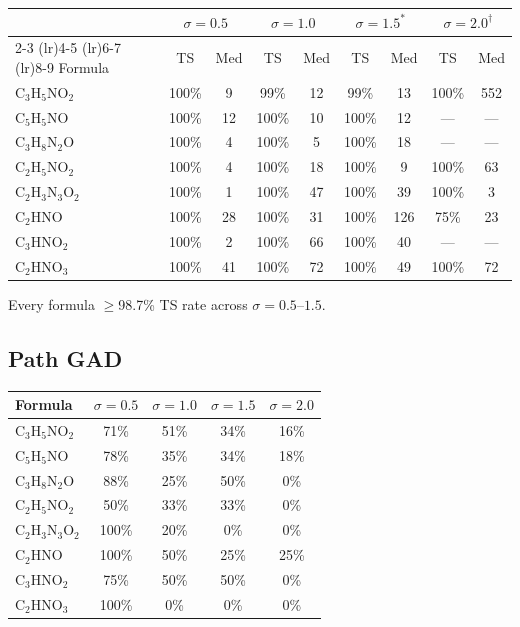 \documentclass[11pt,a4paper]{article}
\begin{document}
\begin{center}\small
\begin{tabular}{lcccccccc}
\toprule
 & \multicolumn{2}{c}{$\sigma = 0.5$} & \multicolumn{2}{c}{$\sigma = 1.0$}
 & \multicolumn{2}{c}{$\sigma = 1.5^*$} & \multicolumn{2}{c}{$\sigma = 2.0^\dagger$} \\
\cmidrule(lr){2-3} \cmidrule(lr){4-5} \cmidrule(lr){6-7} \cmidrule(lr){8-9}
Formula & TS & Med & TS & Med & TS & Med & TS & Med \\
\midrule
C$_3$H$_5$NO$_2$ & 100\% & 9  & 99\% & 12 & 99\% & 13 & 100\% & 552 \\
C$_5$H$_5$NO      & 100\% & 12 & 100\% & 10 & 100\% & 12 & --- & --- \\
C$_3$H$_8$N$_2$O  & 100\% & 4  & 100\% & 5  & 100\% & 18 & --- & --- \\
C$_2$H$_5$NO$_2$  & 100\% & 4  & 100\% & 18 & 100\% & 9  & 100\% & 63 \\
C$_2$H$_3$N$_3$O$_2$ & 100\% & 1 & 100\% & 47 & 100\% & 39 & 100\% & 3 \\
C$_2$HNO           & 100\% & 28 & 100\% & 31 & 100\% & 126 & 75\% & 23 \\
C$_3$HNO$_2$       & 100\% & 2  & 100\% & 66 & 100\% & 40 & --- & --- \\
C$_2$HNO$_3$       & 100\% & 41 & 100\% & 72 & 100\% & 49 & 100\% & 72 \\
\bottomrule
\end{tabular}
\end{center}

Every formula $\geq$98.7\% TS rate across $\sigma = 0.5$--$1.5$.

\subsection{Path GAD}

\begin{center}\small
\begin{tabular}{lcccc}
\toprule
Formula & $\sigma = 0.5$ & $\sigma = 1.0$ & $\sigma = 1.5$ & $\sigma = 2.0$ \\
\midrule
C$_3$H$_5$NO$_2$ & 71\% & 51\% & 34\% & 16\% \\
C$_5$H$_5$NO      & 78\% & 35\% & 34\% & 18\% \\
C$_3$H$_8$N$_2$O  & 88\% & 25\% & 50\% & 0\% \\
C$_2$H$_5$NO$_2$  & 50\% & 33\% & 33\% & 0\% \\
C$_2$H$_3$N$_3$O$_2$ & 100\% & 20\% & 0\% & 0\% \\
C$_2$HNO           & 100\% & 50\% & 25\% & 25\% \\
C$_3$HNO$_2$       & 75\% & 50\% & 50\% & 0\% \\
C$_2$HNO$_3$       & 100\% & 0\% & 0\% & 0\% \\
\bottomrule
\end{tabular}
\end{center}
\end{document}
